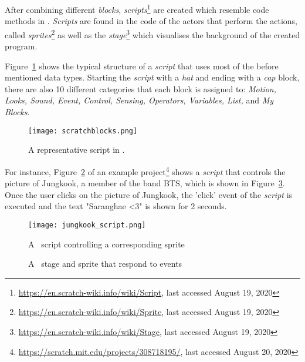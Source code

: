 After combining different \textit{blocks}, \textit{scripts}\footnote{\url{https://en.scratch-wiki.info/wiki/Script}, last accessed August 19, 2020} are created which resemble code methods in \java{}. \textit{Scripts} are found in the code of the actors that perform the actions, called \textit{sprites}\footnote{\url{https://en.scratch-wiki.info/wiki/Sprite}, last accessed August 19, 2020} as well as the \textit{stage}\footnote{\url{https://en.scratch-wiki.info/wiki/Stage}, last accessed August 19, 2020} which visualises the background of the created program. 

Figure~\ref{fig:scratchblocks} shows the typical structure of a \scratch{} \textit{script} that uses most of the before mentioned data types. Starting the \textit{script} with a \textit{hat} and ending with a \textit{cap} block, there are also 10 different categories that each block is assigned to: \textit{Motion, Looks, Sound, Event, Control, Sensing, Operators, Variables, List,} and \textit{My Blocks}. 

\begin{figure}[hbtp]
    \centering
    \texttt{[image: scratchblocks.png]}
    \caption[A representative \scratch\ script]{\label{fig:scratchblocks} A representative script in \scratch{}.}
\end{figure}

For instance, Figure~\ref{fig:script} of an example \scratch{} project\footnote{\url{https://scratch.mit.edu/projects/308718195/}, last accessed August 20, 2020} shows a \textit{script} that controls the picture of Jungkook, a member of the band BTS, which is shown in Figure~\ref{fig:sprite}. Once the user clicks on the picture of Jungkook, the 'click' event of the \textit{script} is executed and the text "Saranghae <3" is shown for 2 seconds.

\begin{figure}[hbtp]
    \centering
    \texttt{[image: jungkook\_script.png]}
    \caption[Script code controlling a sprite]{\label{fig:script} A \scratch\ script controlling a corresponding sprite}
\end{figure}

\begin{figure}[hbtp]%
    \centering
    \qquad
    \caption[A sprite's reaction after an executed event]{\label{fig:sprite}A \scratch\ stage and sprite that respond to events}%
\end{figure}

